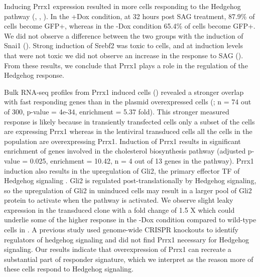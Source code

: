 Inducing Prrx1 expression resulted in more cells responding to the Hedgehog pathway (, , ). In the +Dox condition, at 32 hours post SAG treatment, 87.9\% of cells become GFP+, whereas in the -Dox condition 65.4\% of cells become GFP+. We did not observe a difference between the two groups with the induction of Snai1 (). Strong induction of Srebf2 was toxic to cells, and at induction levels that were not toxic we did not observe an increase in the response to SAG  (). From these results, we conclude that Prrx1 plays a role in the regulation of the Hedgehog response.

Bulk RNA-seq profiles from Prrx1 induced cells () revealed a stronger overlap with fast responding genes than in the plasmid overexpressed cells (; n = 74 out of 300, p-value = 4e-34, enrichment = 5.37 fold). This stronger measured response is likely because in transiently transfected cells only a subset of the cells are expressing Prrx1 whereas in the lentiviral transduced cells all the cells in the population are overexpressing Prrx1. Induction of Prrx1 results in significant enrichment of genes involved in the cholesterol biosynthesis pathway (adjusted p-value = 0.025, enrichment = 10.42, n = 4 out of 13 genes in the pathway). Prrx1 induction also results in the upregulation of Gli2, the primary effector TF of Hedgehog signaling \cite{Kong2019-wo,Briscoe2013-ze,Lee2016-bf}. Gli2 is regulated post-translationally by Hedgehog signaling, so the upregulation of Gli2 in uninduced cells may result in a larger pool of Gli2 protein to activate when the pathway is activated. We observe slight leaky expression in the transduced clone with a fold change of 1.5 X which could underlie some of the higher response in the -Dox condition compared to wild-type cells in . A previous study used genome-wide CRISPR knockouts \cite{Pusapati2018-gs} to identify regulators of hedgehog signaling and did not find Prrx1 necessary for Hedgehog signaling. Our results indicate that overexpression of Prrx1 can recreate a substantial part of responder signature, which we interpret as the reason more of these cells respond to Hedgehog signaling.


